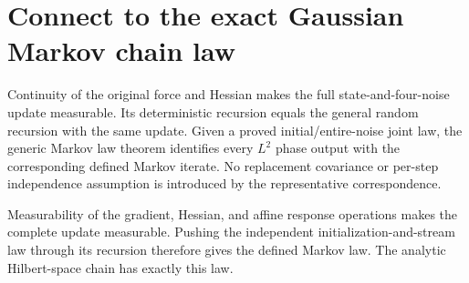 \documentclass[11pt,a4paper]{article}
\begin{document}
\section{\texorpdfstring{Connect to the exact Gaussian Markov chain law}{Connect to the exact Gaussian Markov chain law}}


Continuity of the original force and Hessian makes the full state-and-four-noise update measurable. Its deterministic recursion equals the general random recursion with the same update. Given a proved initial/\allowbreak{}entire-noise joint law, the generic Markov law theorem identifies every \(L^{2}\) phase output with the corresponding defined Markov iterate. No replacement covariance or per-step independence assumption is introduced by the representative correspondence.



Measurability of the gradient, Hessian, and affine response operations makes the complete update measurable. Pushing the independent initialization-and-stream law through its recursion therefore gives the defined Markov law. The analytic Hilbert-space chain has exactly this law.
\end{document}
